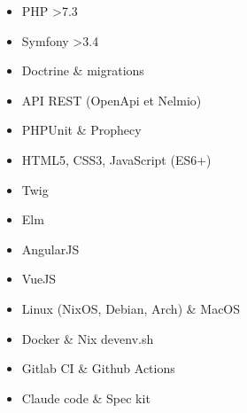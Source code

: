 \documentclass[11pt, a4paper]{libs/awesome-cv/awesome-cv}
\begin{document}

\begin{itemize}[label=\textbullet]
	\item PHP >7.3
	\item Symfony >3.4
	\item Doctrine \& migrations
	\item API REST (OpenApi et Nelmio)
	\item PHPUnit \& Prophecy
\end{itemize}

\begin{itemize}[label=\textbullet]
	\item HTML5, CSS3, JavaScript (ES6+)
	\item Twig
	\item Elm
	\item AngularJS
	\item VueJS
\end{itemize}

\begin{itemize}[label=\textbullet]
	\item Linux (NixOS, Debian, Arch) \& MacOS
	\item Docker \& Nix devenv.sh
	\item Gitlab CI \& Github Actions
	\item Claude code \& Spec kit
\end{itemize}




\end{document}
